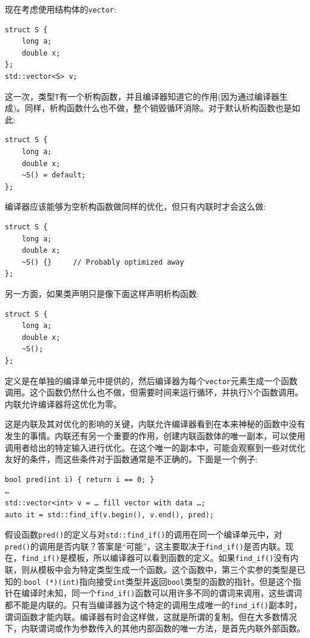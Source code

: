 现在考虑使用结构体的\texttt{vector}:

\begin{lstlisting}[style=styleCXX]
struct S {
	long a;
	double x;
};
std::vector<S> v;
\end{lstlisting}

这一次，类型\texttt{T}有一个析构函数，并且编译器知道它的作用(因为通过编译器生成)。同样，析构函数什么也不做，整个销毁循环消除。对于默认析构函数也是如此:

\begin{lstlisting}[style=styleCXX]
struct S {
	long a;
	double x;
	~S() = default;
};
\end{lstlisting}

编译器应该能够为空析构函数做同样的优化，但只有内联时才会这么做:

\begin{lstlisting}[style=styleCXX]
struct S {
	long a;
	double x;
	~S() {}     // Probably optimized away
};
\end{lstlisting}

另一方面，如果类声明只是像下面这样声明析构函数:

\begin{lstlisting}[style=styleCXX]
struct S {
	long a;
	double x;
	~S();
};
\end{lstlisting}

定义是在单独的编译单元中提供的，然后编译器为每个\texttt{vector}元素生成一个函数调用。这个函数仍然什么也不做，但需要时间来运行循环，并执行N个函数调用。内联允许编译器将这优化为零。

这是内联及其对优化的影响的关键，内联允许编译器看到在本来神秘的函数中没有发生的事情。内联还有另一个重要的作用，创建内联函数体的唯一副本，可以使用调用者给出的特定输入进行优化。在这个唯一的副本中，可能会观察到一些对优化友好的条件，而这些条件对于函数通常是不正确的。下面是一个例子:

\begin{lstlisting}[style=styleCXX]
bool pred(int i) { return i == 0; }
… 
std::vector<int> v = … fill vector with data …;
auto it = std::find_if(v.begin(), v.end(), pred);
\end{lstlisting}

假设函数\texttt{pred()}的定义与对\texttt{std::find\_if()}的调用在同一个编译单元中，对\texttt{pred()}的调用是否内联？答案是“可能”，这主要取决于\texttt{find\_if()}是否内联。现在，\texttt{find\_if()}是模板，所以编译器可以看到函数的定义。如果\texttt{find\_if()}没有内联，则从模板中会为特定类型生成一个函数。这个函数中，第三个实参的类型是已知的:\texttt{bool (*)(int)}指向接受\texttt{int}类型并返回\texttt{bool}类型的函数的指针。但是这个指针在编译时未知，同一个\texttt{find\_if()}函数可以用许多不同的谓词来调用，这些谓词都不能是内联的。只有当编译器为这个特定的调用生成唯一的\texttt{find\_if()}副本时，谓词函数才能内联。编译器有时会这样做，这就是所谓的复制。但在大多数情况下，内联谓词或作为参数传入的其他内部函数的唯一方法，是首先内联外部函数。 

